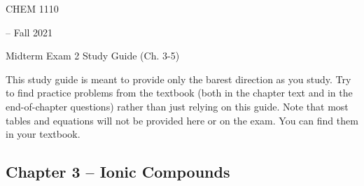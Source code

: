 \documentclass[12pt, letterpaper]{memoir}
\begin{document}
	\mainmatter
	
	\begin{center}
		{\Huge CHEM 1110}
		{\LARGE-- Fall 2021
		
		Midterm Exam 2 Study Guide (Ch. 3-5)}
	\end{center}
	
	This study guide is meant to provide only the barest direction as you study. Try to find practice problems from the textbook (both in the chapter text and in the end-of-chapter questions) rather than just relying on this guide. Note that most tables and equations will not be provided here or on the exam. You can find them in your textbook. 

	\subsection*{Chapter 3 -- Ionic Compounds}
\end{document}

